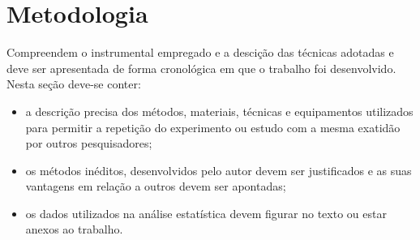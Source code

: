 \chapter{Metodologia}\label{cap:metodologia}

Compreendem o instrumental empregado e a descição das técnicas adotadas e deve ser apresentada de forma cronológica em que o trabalho foi desenvolvido. Nesta seção deve-se conter:

\begin{itemize}
    \item a descrição precisa dos métodos, materiais, técnicas e equipamentos utilizados para permitir a repetição do experimento ou estudo com a mesma exatidão por outros pesquisadores;
    \item os métodos inéditos, desenvolvidos pelo autor devem ser justificados e as suas vantagens em relação a outros devem ser apontadas;
    \item os dados utilizados na análise estatística devem figurar no texto ou estar anexos ao trabalho.
\end{itemize}